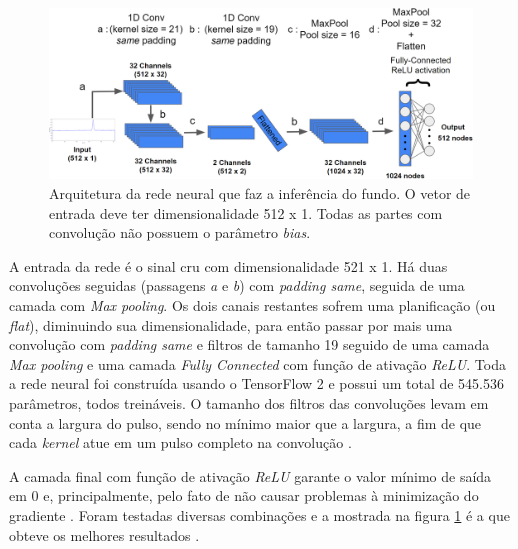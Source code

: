 \documentclass[a4paper,12pt,oneside]{book}
\begin{document}

\begin{figure}[H]
    \centering
    \includegraphics[scale = 0.238]{figs/Source to only bkg.png}
    \caption{Arquitetura da rede neural que faz a inferência do fundo. O vetor de entrada deve ter dimensionalidade 512 x 1. Todas as partes com convolução não possuem o parâmetro \textit{bias}.}
    \label{fig:arq_source_to_bkg}
\end{figure}

\par A entrada da rede é o sinal cru com dimensionalidade 521 x 1. Há duas convoluções seguidas (passagens \textit{a} e \textit{b}) com \textit{padding same}, seguida de uma camada com \textit{Max pooling}. Os dois canais restantes sofrem uma planificação (ou \textit{flat}), diminuindo sua dimensionalidade, para então passar por mais uma convolução com \textit{padding same} e filtros de tamanho 19 seguido de uma camada \textit{Max pooling} e uma camada \textit{Fully Connected} com função de ativação \textit{ReLU}. Toda a rede neural foi construída usando o TensorFlow 2 e possui um total de 545.536 parâmetros, todos treináveis. O tamanho dos filtros das convoluções levam em conta a largura do pulso, sendo no mínimo maior que a largura, a fim de que cada \textit{kernel} atue em um pulso completo na convolução \cite{FORTINO2022166497}.

\par A camada final com função de ativação \textit{ReLU} garante o valor mínimo de saída em 0 e, principalmente, pelo fato de não causar problemas à minimização do gradiente \cite{VGP}. Foram testadas diversas combinações e a mostrada na figura \ref{fig:arq_source_to_bkg} é a que obteve os melhores resultados \cite{FORTINO2022166497}. 
\end{document}
